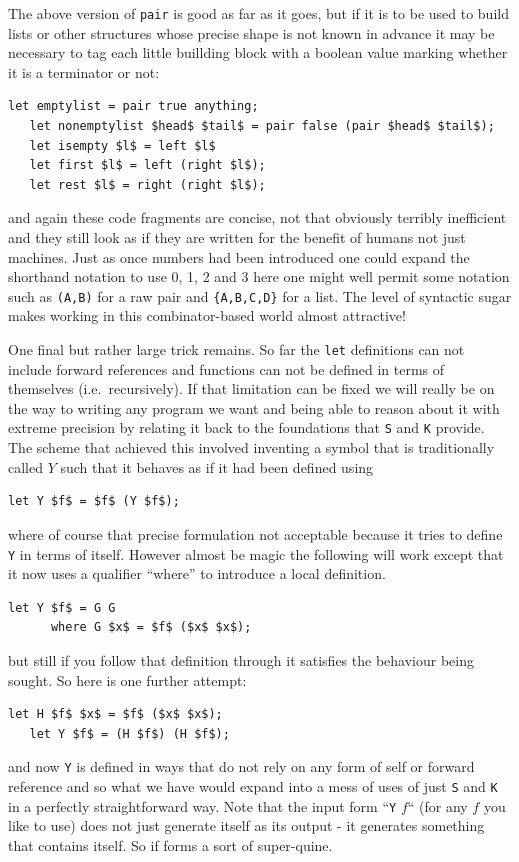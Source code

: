 The above version of \verb+pair+ is good as far as it goes, but if
it is to be used to build lists or other structures whose precise shape
is not known in advance it may be necessary to tag each little buillding
block with a boolean value marking whether it is a terminator or not:
\begin{lstlisting}[mathescape=true]
   let emptylist = pair true anything;
   let nonemptylist $head$ $tail$ = pair false (pair $head$ $tail$);
   let isempty $l$ = left $l$
   let first $l$ = left (right $l$);
   let rest $l$ = right (right $l$);
\end{lstlisting}
and again these code fragments are concise, not that obviously
terribly inefficient and they still look as if they are written
for the benefit of humans not just machines. Just as once numbers had been
introduced one could expand the shorthand notation to use 0, 1, 2 and 3 here
one might well permit some notation such as \verb+(A,B)+ for a raw pair
and \verb+{A,B,C,D}+ for a list. The level of syntactic sugar makes working
in this combinator-based world almost attractive!

One final but rather large trick remains. So far the \verb+let+
definitions can not include forward references and functions can not
be defined in terms of themselves (i.e.\ recursively). If that limitation
can be fixed we will really be on the way to writing any program we want
and being able to reason about it with extreme precision by relating
it back to the foundations that \verb+S+ and \verb+K+ provide. The
scheme that achieved this involved inventing a symbol that is traditionally
called $Y$ such that it behaves as if it had been defined using
\begin{lstlisting}[mathescape=true]
   let Y $f$ = $f$ (Y $f$); 
\end{lstlisting}
where of course that precise formulation not acceptable because it
tries to define \verb+Y+ in terms of itself.
However almost be magic the following will work except that it now
uses a qualifier ``where'' to introduce a local definition.
\begin{lstlisting}[mathescape=true]
   let Y $f$ = G G
      where G $x$ = $f$ ($x$ $x$);
\end{lstlisting}
but still if you follow that definition through it satisfies the behaviour
being sought. So here is one further attempt:
\begin{lstlisting}[mathescape=true]
   let H $f$ $x$ = $f$ ($x$ $x$);
   let Y $f$ = (H $f$) (H $f$);
\end{lstlisting}
and now \verb+Y+ is defined in ways that do not rely on any form of
self or forward reference and so what we have would expand into a
mess of uses of just \verb+S+ and \verb+K+ in a perfectly straightforward
way. Note that the input form ``\verb+Y+ $f$`` (for any $f$ you like to use) does
not just generate itself as its output - it generates something that contains
itself. So if forms a sort of super-quine.

